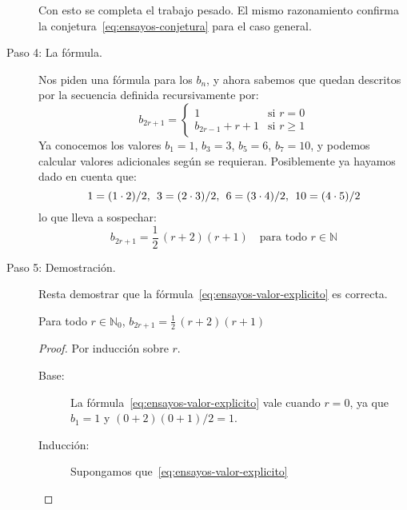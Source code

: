 \begin{solution}
\begin{description}
      Con esto se completa el trabajo pesado.
      El mismo razonamiento confirma
      la conjetura~\eqref{eq:ensayos-conjetura}
      para el caso general.
    \item[Paso 4: La fórmula.]
      Nos piden una fórmula para los \(b_n\),
      y ahora sabemos que quedan descritos
      por la secuencia definida recursivamente por:
      \begin{equation}
	\label{eq:ensayos-recurrencia}
	b_{2 r + 1}
	  =
	  \begin{cases}
	    1			& \text{si \(r = 0\)} \\
	    b_{2 r - 1} + r + 1	& \text{si \(r \ge 1\)}
	  \end{cases}
      \end{equation}
      Ya conocemos los valores
      \(b_1 = 1\), \(b_3 = 3\), \(b_5 = 6\), \(b_7 = 10\),
      y podemos calcular valores adicionales según se requieran.
      Posiblemente ya hayamos dado en cuenta que:
      \begin{equation}
	\label{eq:ensayos-valores}
	 1 = (1 \cdot 2) / 2,\hspace{1ex}
	 3 = (2 \cdot 3) / 2,\hspace{1ex}
	 6 = (3 \cdot 4) / 2,\hspace{1ex}
	10 = (4 \cdot 5) / 2
      \end{equation}
      lo que lleva a sospechar:
      \begin{equation}
	\label{eq:ensayos-valor-explicito}
	b_{2 r + 1}
	  = \frac{1}{2} \, (r + 2) (r + 1)
	       \quad\text{para todo \(r \in \mathbb{N}\)}
      \end{equation}
    \item[Paso 5: Demostración.]
      Resta demostrar
      que la fórmula~\eqref{eq:ensayos-valor-explicito}
      es correcta.
      \begin{proposition}
	\label{prop:Miskatonic-essay-competition}
	Para todo \(r \in \mathbb{N}_0\),
	\(b_{2 r + 1} = \frac{1}{2} \, (r + 2) (r + 1)\)
      \end{proposition}
      \begin{proof}
	Por inducción sobre \(r\).
	\begin{description}
	\item[Base:]
	  La fórmula~\eqref{eq:ensayos-valor-explicito}
	  vale cuando \(r = 0\),
	  ya que \(b_1 = 1\)
	  y \((0 + 2) (0 + 1) / 2 = 1\).
	\item[Inducción:]
	  Supongamos que~\eqref{eq:ensayos-valor-explicito}

\end{description}
\end{proof}
\end{description}
\end{solution}

